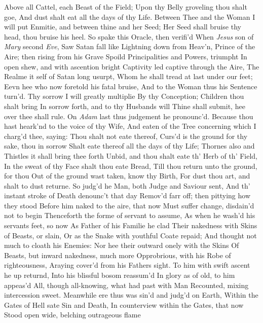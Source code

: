 \documentclass[11pt]{book}
\newcounter {last}
\begin{document}
Above all Cattel, each Beast of the Field; 
Upon thy Belly groveling thou shalt goe, 
And dust shalt eat all the days of thy Life. 
Between Thee and the Woman I will put 
Enmitie, and between thine and her Seed; 
Her Seed shall bruise thy head, thou bruise his heel. 
\quad So spake this Oracle, then verifi'd 
When \textit{Jesus} son of \textit{Mary} second \textit{Eve}, 
Saw Satan fall like Lightning down from Heav'n, 
Prince of the Aire; then rising from his Grave 
Spoild Principalities and Powers, triumpht 
In open shew, and with ascention bright 
Captivity led captive through the Aire, 
The Realme it self of Satan long usurpt, 
Whom he shall tread at last under our feet; 
Eevn hee who now foretold his fatal bruise, 
And to the Woman thus his Sentence turn'd. 
\quad Thy sorrow I will greatly multiplie 
By thy Conception; Children thou shalt bring 
In sorrow forth, and to thy Husbands will 
Thine shall submit, hee over thee shall rule. 
\quad On \textit{Adam} last thus judgement he pronounc'd. 
Because thou hast heark'nd to the voice of thy Wife, 
And eaten of the Tree concerning which 
I charg'd thee, saying: Thou shalt not eate thereof, 
Curs'd is the ground for thy sake, thou in sorrow 
Shalt eate thereof all the days of thy Life; 
Thornes also and Thistles it shall bring thee forth 
Unbid, and thou shalt eate th' Herb of th' Field, 
In the sweat of thy Face shalt thou eate Bread, 
Till thou return unto the ground, for thou 
Out of the ground wast taken, know thy Birth, 
For dust thou art, and shalt to dust returne. 
\quad  So judg'd he Man, both Judge and Saviour sent, 
And th' instant stroke of Death denounc't that day 
Remov'd farr off; then pittying how they stood 
Before him naked to the aire, that now 
Must suffer change, disdain'd not to begin 
Thenceforth the forme of servant to assume, 
As when he wash'd his servants feet, so now 
As Father of his Familie he clad 
Their nakedness with Skins of Beasts, or slain, 
Or as the Snake with youthful Coate repaid; 
And thought not much to cloath his Enemies: 
Nor hee their outward onely with the Skins 
Of Beasts, but inward nakedness, much more 
Opprobrious, with his Robe of righteousness, 
Araying cover'd from his Fathers sight. 
To him with swift ascent he up returnd, 
Into his blissful bosom reassum'd 
In glory as of old, to him appeas'd 
All, though all-knowing, what had past with Man 
Recounted, mixing intercession sweet. 
Meanwhile ere thus was sin'd and judg'd on Earth, 
Within the Gates of Hell sate Sin and Death, 
In counterview within the Gates, that now 
Stood open wide, belching outrageous flame 
\end{document}
